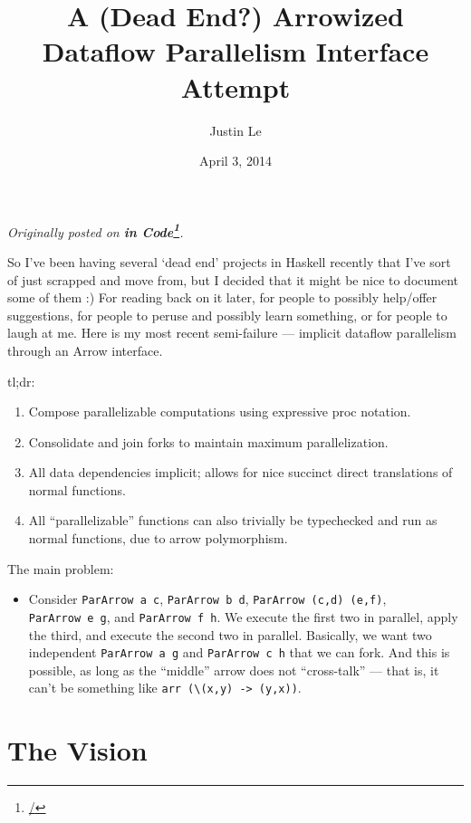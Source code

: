 \documentclass[]{article}
\title{A (Dead End?) Arrowized Dataflow Parallelism Interface Attempt}
\author{Justin Le}
\date{April 3, 2014}
\renewcommand{\href}[2]{#2\footnote{\url{#1}}}
\begin{document}
\maketitle

\emph{Originally posted on \textbf{\href{/}{in Code}}.}

So I've been having several `dead end' projects in Haskell recently that
I've sort of just scrapped and move from, but I decided that it might be
nice to document some of them :) For reading back on it later, for
people to possibly help/offer suggestions, for people to peruse and
possibly learn something, or for people to laugh at me. Here is my most
recent semi-failure --- implicit dataflow parallelism through an Arrow
interface.

tl;dr:

\begin{enumerate}
\def\labelenumi{\arabic{enumi}.}
\tightlist
\item
  Compose parallelizable computations using expressive proc notation.
\item
  Consolidate and join forks to maintain maximum parallelization.
\item
  All data dependencies implicit; allows for nice succinct direct
  translations of normal functions.
\item
  All ``parallelizable'' functions can also trivially be typechecked and
  run as normal functions, due to arrow polymorphism.
\end{enumerate}

The main problem:

\begin{itemize}
\tightlist
\item
  Consider \texttt{ParArrow\ a\ c}, \texttt{ParArrow\ b\ d},
  \texttt{ParArrow\ (c,d)\ (e,f)}, \texttt{ParArrow\ e\ g}, and
  \texttt{ParArrow\ f\ h}. We execute the first two in parallel, apply
  the third, and execute the second two in parallel. Basically, we want
  two independent \texttt{ParArrow\ a\ g} and \texttt{ParArrow\ c\ h}
  that we can fork. And this is possible, as long as the ``middle''
  arrow does not ``cross-talk'' --- that is, it can't be something like
  \texttt{arr\ (\textbackslash{}(x,y)\ -\textgreater{}\ (y,x))}.
\end{itemize}

\section{The Vision}\label{the-vision}
\end{document}
